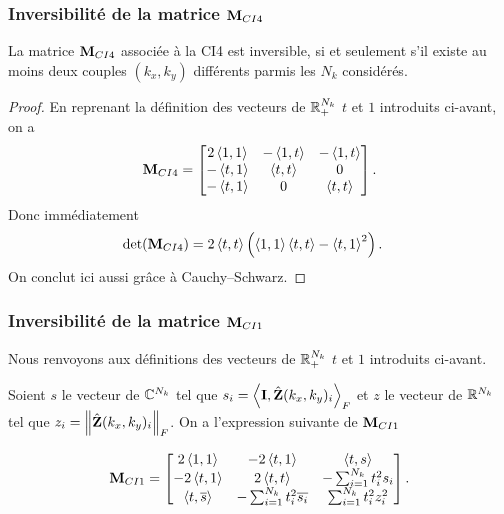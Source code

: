       \subsubsection[Inversibilité de la matrice MCI4]{Inversibilité de la matrice \(\mathbf{M}_{CI4}\)}

      \begin{prop}
        La matrice \({\mathbf{M}}_{CI4}\)
        associée à la CI4 est inversible, si et seulement s'il existe au moins deux couples \((k_{x},k_{y})\) différents parmis les \(N_k\) considérés.
      \end{prop}

      \begin{proof}
        En reprenant la définition des vecteurs de \(\mathbb R_+^{N_{k}}\) \(t\) et \(1\) introduits ci-avant, on a
        \begin{equation*}
          {\mathbf{M}}_{CI4} = \begin{bmatrix}
          2\left<{1},{1}\right> & -\left<{1},{t}\right> & -\left<{1},{t}\right>
          \\
          -\left<{t},{1}\right> & \left<{t},{t}\right>  & 0
          \\
          -\left<{t},{1}\right> & 0          & \left<{t},{t}\right>
          \end{bmatrix}.
        \end{equation*}
        Donc immédiatement
        \begin{align*}
          \det({\mathbf{M}}_{CI4}) &= 2\left<{t},{t}\right>\left( \left<{1},{1}\right>\left<{t},{t}\right> - \left<{t},{1}\right>^2\right).
        \end{align*}
        On conclut ici aussi grâce à Cauchy–Schwarz.
      \end{proof}

      \subsubsection[Inversibilité de la matrice MCI1]{Inversibilité de la matrice \(\mathbf{M}_{CI1}\)}

      Nous renvoyons aux définitions des vecteurs de \(\mathbb R_+^{N_{k}}\) \(t\) et \(1\) introduits ci-avant.

      Soient \(s\) le vecteur de \(\mathbb C^{N_{k}}\) tel que \(s_i = \left<{\mathbf{I}},{\hat{\mathbf{Z}}(k_{x},k_{y})_i}\right>_F\) et \(z\) le vecteur de \(\mathbb R^{N_{k}}\) tel que \(z_i = \left\lVert\hat{\mathbf{Z}}(k_{x},k_{y})_i\right\rVert_F\).
      On a l'expression suivante de \({\mathbf{M}_{CI1}}\)

      \begin{equation*}
        {\mathbf{M}}_{CI1} = \begin{bmatrix}
        2\left<{1},{1}\right>  & -2\left<{t},{1}\right> & \left<{t},{s}\right>
        \\
        -2\left<{t},{1}\right> & 2\left<{t},{t}\right> & -\sum_{i=1}^{N_{k}} t_i^2 s_i
        \\
        \left<{t},{{\overline{s}}}\right> & -\sum_{i=1}^{N_{k}} t_i^2 {\overline{s_i}} & \sum_{i=1}^{N_{k}} t_i^2 z_i^2 
        \end{bmatrix}.
      \end{equation*}
      
